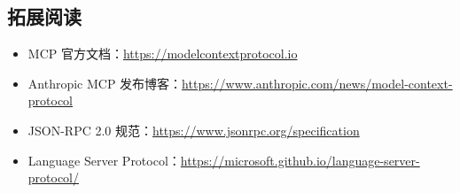 \documentclass[a4paper]{article}
\begin{document}
\subsection{拓展阅读}

\begin{itemize}
    \item MCP 官方文档：\url{https://modelcontextprotocol.io}
    \item Anthropic MCP 发布博客：\url{https://www.anthropic.com/news/model-context-protocol}
    \item JSON-RPC 2.0 规范：\url{https://www.jsonrpc.org/specification}
    \item Language Server Protocol：\url{https://microsoft.github.io/language-server-protocol/}
\end{itemize}

\end{document}
